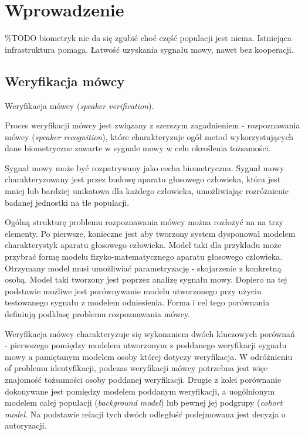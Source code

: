 \chapter{Wprowadzenie}

\%TODO
biometryk nie da się zgubić choć część populacji jest niema. Istniejąca infrastruktura pomaga. Łatwość uzyskania sygnału mowy, nawet bez kooperacji.

\section{Weryfikacja mówcy}

Weryfikacja mówcy (\textit{speaker verification}).

Proces weryfikacji mówcy jest związany z szerszym zagadnieniem - rozpoznawania mówcy (\textit{speaker recognition}), które charakteryzuje ogół metod wykorzystujących dane biometryczne zawarte w sygnale mowy w celu określenia tożsamości.

Sygnał mowy może być rozpatrywany jako cecha biometryczna. Sygnał mowy charakteryzowany jest przez budowę aparatu głosowego człowieka, która jest mniej lub bardziej unikatowa dla każdego człowieka, umożliwiając rozróżnienie badanej jednostki na tle populacji.

Ogólną strukturę problemu rozpoznawania mówcy można rozłożyć na na trzy elementy.\cite{fosr} Po pierwsze, konieczne jest aby tworzony system dysponował modelem charakterystyk aparatu głosowego człowieka. Model taki dla przykładu może przybrać formę modelu fizyko-matematycznego aparatu głosowego człowieka. Otrzymany model musi umożliwiać parametryzację - skojarzenie z konkretną osobą. Model taki tworzony jest poprzez analizę sygnału mowy. Dopiero na tej podstawie możliwe jest porównywanie modelu utworzonego przy użyciu testowanego sygnału z modelem odniesienia. Forma i cel tego porównania definiują podklasę problemu rozpoznawania mówcy.

Weryfikacja mówcy charakteryzuje się wykonaniem dwóch kluczowych porównań - pierwszego pomiędzy modelem utworzonym z poddanego weryfikacji sygnału mowy a pamiętanym modelem osoby której dotyczy weryfikacja. W odróżnieniu of problemu identyfikacji, podczas weryfikacji mówcy potrzebna jest więc znajomość tożsamości osoby poddanej weryfikacji.
Drugie z kolei porównanie dokonywane jest pomiędzy modelem poddanym weryfikacji, a uogólnionym modelem całej populacji (\textit{background model}) lub pewnej jej podgrupy (\textit{cohort model}. Na podstawie relacji tych dwóch odległość podejmowana jest decyzja o autoryzacji.

